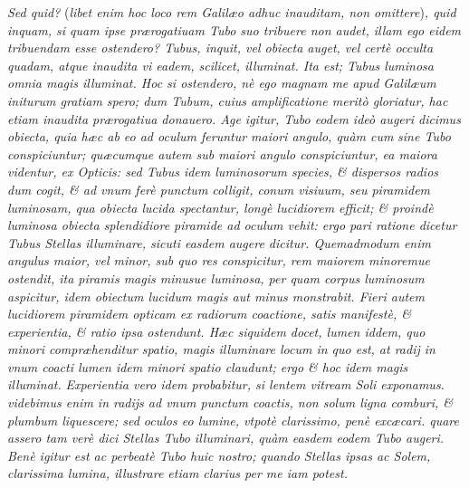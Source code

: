 \documentclass[11pt,twoside,openany]{book}
\begin{document}
\textit{Sed quid? }(\textit{libet enim hoc loco rem Galilæo adhuc inauditam, non omittere})\textit{, quid inquam, si quam ipse prærogatiuam Tubo suo tribuere non audet, illam ego eidem tribuendam esse ostendero? Tubus, inquit, vel obiecta auget, vel certè occulta quadam, atque inaudita vi eadem, scilicet, illuminat. Ita est; Tubus luminosa omnia magis illuminat. Hoc si ostendero, nè ego magnam me apud Galilæum initurum gratiam spero; dum Tubum, cuius amplificatione meritò gloriatur, hac etiam inaudita prærogatiua donauero. Age igitur, Tubo eodem ideò augeri dicimus obiecta, quia hæc ab eo ad oculum feruntur maiori angulo, quàm cum }\textit{sine Tubo conspiciuntur; quæcumque autem sub maiori angulo conspiciuntur, ea maiora videntur, ex Opticis: sed Tubus idem luminosorum species, \& dispersos radios dum cogit, \& ad vnum ferè punctum colligit, conum visiuum, seu piramidem luminosam, qua obiecta lucida spectantur, longè lucidiorem efficit; \& proindè luminosa obiecta splendidiore piramide ad oculum vehit: ergo pari ratione dicetur Tubus Stellas illuminare, sicuti easdem augere dicitur. Quemadmodum enim angulus maior, vel minor, sub quo res conspicitur, rem maiorem minoremue ostendit, ita piramis magis minusue luminosa, per quam corpus luminosum aspicitur, idem obiectum lucidum magis aut minus monstrabit. Fieri autem lucidiorem piramidem opticam ex radiorum coactione, satis manifestè, \& experientia, \& ratio ipsa ostendunt. Hæc siquidem docet, lumen iddem, quo minori compræhenditur spatio, magis illuminare locum in quo est, at radij in vnum coacti lumen idem minori spatio claudunt; ergo \& hoc idem magis illuminat.}\textit{ }\textit{Experientia vero idem probabitur, si lentem vitream Soli exponamus. videbimus enim in radijs ad vnum punctum coactis, non solum ligna comburi, \& plumbum liquescere; sed oculos eo lumine, vtpotè clarissimo, penè excæcari. quare assero tam verè dici Stellas Tubo illuminari, quàm easdem eodem Tubo augeri.}\textit{ }\textit{Benè igitur est ac perbeatè Tubo huic nostro; quando Stellas ipsas ac Solem, clarissima lumina, illustrare etiam clarius per me iam potest.}
\end{document}
